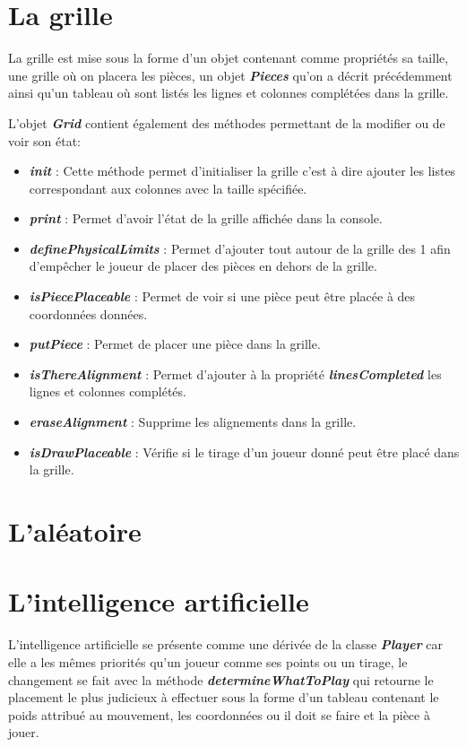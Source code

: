 \documentclass[a4paper]{report}
\begin{document}
\section{La grille}
La grille est mise sous la forme d'un objet contenant comme propriétés sa taille, une grille où on placera les pièces, un objet \textbf{\textit{Pieces}} qu'on a décrit précédemment ainsi qu'un tableau où sont listés les lignes et colonnes complétées dans la grille.

L'objet \textbf{\textit{Grid}} contient également des méthodes permettant de la modifier ou de voir son état:
\begin{itemize}
	\item \textbf{\textit{init}} : Cette méthode permet d'initialiser la grille c'est à dire ajouter les listes correspondant aux colonnes avec la taille spécifiée.
	\item \textbf{\textit{print}} : Permet d'avoir l'état de la grille affichée dans la console.
	\item \textbf{\textit{definePhysicalLimits}} : Permet d'ajouter tout autour de la grille des 1 afin d'empêcher le joueur de placer des pièces en dehors de la grille.
	\item \textbf{\textit{isPiecePlaceable}} : Permet de voir si une pièce peut être placée à des coordonnées données.
	\item \textbf{\textit{putPiece}} : Permet de placer une pièce dans la grille.
	\item \textbf{\textit{isThereAlignment}} : Permet d'ajouter à la propriété \textbf{\textit{linesCompleted}} les lignes et colonnes complétés.
	\item \textbf{\textit{eraseAlignment}} : Supprime les alignements dans la grille.
	\item \textbf{\textit{isDrawPlaceable}} : Vérifie si le tirage d'un joueur donné peut être placé dans la grille.
\end{itemize}

\section{L'aléatoire}


\section{L'intelligence artificielle}
L'intelligence artificielle se présente comme une dérivée de la classe \textbf{\textit{Player}} car elle a les mêmes priorités qu'un joueur comme ses points ou un tirage, le changement se fait avec la méthode \textbf{\textit{determineWhatToPlay}} qui retourne le placement le plus judicieux à effectuer sous la forme d'un tableau contenant le poids attribué au mouvement, les coordonnées ou il doit se faire et la pièce à jouer. \\
\end{document}
